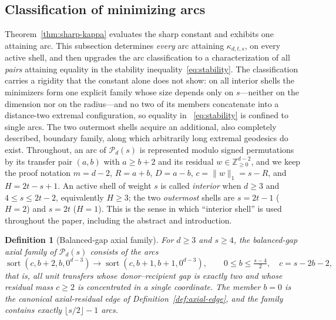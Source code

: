 \documentclass[pdflatex,sn-mathphys-num]{sn-jnl}
\theoremstyle{thmstyleone}
\theoremstyle{thmstylethree}
\newtheorem{definition}[theorem]{Definition}
\theoremstyle{thmstyletwo}
\newcommand{\Z}{\mathbb Z}
\begin{document}
\subsection{Classification of minimizing arcs}
\label{sec:arc-classification}

Theorem~\ref{thm:sharp-kappa} evaluates the sharp constant and exhibits one
attaining arc.  This subsection determines \emph{every} arc attaining
$\kappa_{d,t,s}$, on every active shell, and then upgrades the arc
classification to a characterization of all \emph{pairs} attaining equality
in the stability inequality~\eqref{eq:stability}.  The classification carries
a rigidity that the constant alone does not show: on all interior shells the
minimizers form one explicit family whose size depends only on
$s$---neither on the dimension nor on the radius---and no two of its members
concatenate into a distance-two extremal configuration, so equality in
~\eqref{eq:stability} is confined to single arcs.  The two outermost shells
acquire an additional, also completely described, boundary family, along
which arbitrarily long extremal geodesics do exist.  Throughout, an
arc of $\mathcal P_d(s)$ is represented modulo signed permutations by its
transfer pair $(a,b)$ with $a\ge b+2$ and its residual $w\in\Z_{\ge0}^{d-2}$,
and we keep the proof notation $m=d-2$, $R=a+b$, $D=a-b$, $c=\|w\|_1=s-R$,
and $H=2t-s+1$.  An active shell of weight $s$ is called \emph{interior}
when $d\ge3$ and $4\le s\le2t-2$, equivalently $H\ge3$; the two
\emph{outermost} shells are $s=2t-1$ ($H=2$) and $s=2t$ ($H=1$).  This is
the sense in which ``interior shell'' is used throughout the paper,
including the abstract and introduction.

\begin{definition}[Balanced-gap axial family]
\label{def:balanced-family}
For $d\ge3$ and $s\ge4$, the \emph{balanced-gap axial family} of
$\mathcal P_d(s)$ consists of the arcs
\begin{equation}
 \operatorname{sort}(c,b+2,b,0^{d-3})
 \longrightarrow
 \operatorname{sort}(c,b+1,b+1,0^{d-3}),
 \qquad 0\le b\le\tfrac{s-4}2,\quad c=s-2b-2,      \label{eq:balanced-family}
\end{equation}
that is, all unit transfers whose donor--recipient gap is exactly two and
whose residual mass $c\ge2$ is concentrated in a single coordinate.  The
member $b=0$ is the canonical axial-residual edge of
Definition~\ref{def:axial-edge}, and the family contains exactly
$\lfloor s/2\rfloor-1$ arcs.
\end{definition}
\end{document}
